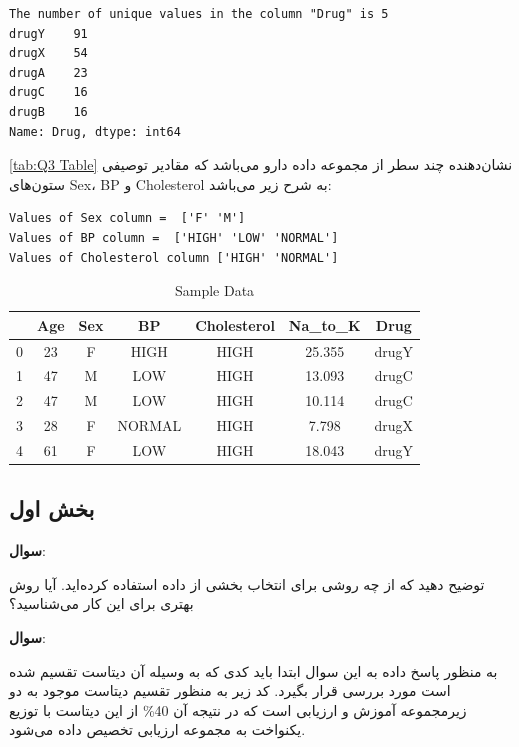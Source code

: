 \documentclass{article}
\begin{document}
\begin{LTR}
\label{Q3 stat}
\begin{verbatim}
The number of unique values in the column "Drug" is 5
drugY    91
drugX    54
drugA    23
drugC    16
drugB    16
Name: Drug, dtype: int64

\end{verbatim}
\end{LTR}

\autoref{tab:Q3 Table}
نشان‌دهنده چند سطر از مجموعه داده دارو می‌باشد که مقادیر توصیفی ستون‌های 
Sex، BP و Cholesterol 
به شرح زیر می‌باشد:
\begin{LTR}
\label{Q3 stat}
\begin{verbatim}
Values of Sex column =  ['F' 'M']
Values of BP column =  ['HIGH' 'LOW' 'NORMAL']
Values of Cholesterol column ['HIGH' 'NORMAL']
\end{verbatim}
\end{LTR}


\begin{table}[H]
\centering
\begin{tabular}{ccccccc}
\toprule
 & Age & Sex & BP & Cholesterol & Na\_to\_K & Drug \\
\midrule
0 & 23 & F & HIGH & HIGH & 25.355 & drugY \\
1 & 47 & M & LOW & HIGH & 13.093 & drugC \\
2 & 47 & M & LOW & HIGH & 10.114 & drugC \\
3 & 28 & F & NORMAL & HIGH & 7.798 & drugX \\
4 & 61 & F & LOW & HIGH & 18.043 & drugY \\
\bottomrule
\end{tabular}
\caption{Sample Data}
\label{tab:Q3 Table}
\end{table}

\subsection{بخش اول}



{\large \textbf{سوال}:} 

توضیح دهید که از چه روشی برای انتخاب بخشی از داده استفاده کرده‌اید. آیا روش بهتری برای این کار می‌شناسید؟



{\large \textbf{سوال}:} 

به منظور پاسخ داده به این سوال ابتدا باید کدی که به وسیله آن دیتاست تقسیم شده است مورد بررسی قرار بگیرد.
کد زیر به منظور تقسیم دیتاست موجود به دو زیرمجموعه آموزش و ارزیابی است که در نتیجه آن
40\% 
 از این دیتاست با توزیع یکنواخت به مجموعه ارزیابی تخصیص داده می‌شود.
\end{document}
